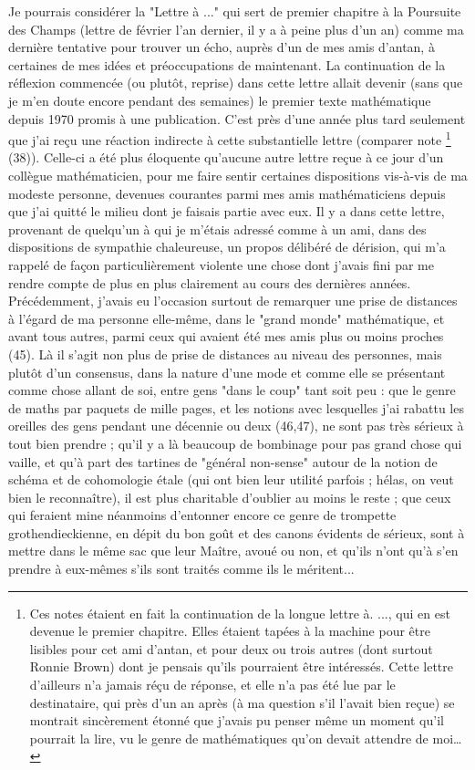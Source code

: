 Je pourrais considérer la "Lettre à ..." qui sert de premier chapitre à la Poursuite des Champs (lettre de février l'an dernier, il y a à peine plus d'un an) comme ma dernière tentative pour trouver un écho, auprès d'un de mes amis d'antan, à certaines de mes idées et préoccupations de maintenant. La continuation de la réflexion commencée (ou plutôt, reprise) dans cette lettre allait devenir (sans que je m’en doute encore pendant des semaines) le premier texte mathématique depuis 1970 promis à une publication. C'est près d'une année plus tard seulement que j’ai reçu une réaction indirecte à cette substantielle lettre (comparer note \footnote{Ces notes étaient en fait la continuation de la longue lettre à. ..., qui en est devenue le premier chapitre. Elles étaient tapées à la machine pour être lisibles pour cet ami d'antan, et pour deux ou trois autres (dont surtout Ronnie Brown) dont je pensais qu'ils pourraient être intéressés. Cette lettre d'ailleurs n'a jamais réçu de réponse, et elle n'a pas été lue par le destinataire, qui près d'un an après (à ma question s'il l'avait bien reçue) se montrait sincèrement étonné que j'avais pu penser même un moment qu'il pourrait la lire, vu le genre de mathématiques qu'on devait attendre de moi…} (38)). Celle-ci a été plus éloquente qu'aucune autre lettre reçue à ce jour d'un collègue mathématicien, pour me faire sentir certaines dispositions vis-à-vis de ma modeste personne, devenues courantes parmi mes amis mathématiciens depuis que j’ai quitté le milieu dont je faisais partie avec eux. Il y a dans cette lettre, provenant de quelqu’un à qui je m'étais adressé comme à un ami, dans des dispositions de sympathie chaleureuse, un propos délibéré de dérision, qui m'a rappelé de façon particulièrement violente une chose dont j'avais fini par me rendre compte de plus en plus clairement au cours des dernières années. Précédemment, j'avais eu l'occasion surtout de remarquer une prise de distances à l'égard de ma personne elle-même, dans le "grand monde" mathématique, et avant tous autres, parmi ceux qui avaient été mes amis plus ou moins proches (45). Là il s'agit non plus de prise de distances au niveau des personnes, mais plutôt d'un consensus, dans la nature d'une mode et comme elle se présentant comme chose allant de soi, entre gens "dans le coup" tant soit peu : que le genre de maths par paquets de mille pages, et les notions avec lesquelles j'ai rabattu les oreilles des gens pendant une décennie ou deux (46,47), ne sont pas très sérieux à tout bien prendre ; qu'il y a là beaucoup de bombinage pour pas grand chose qui vaille, et qu'à part des tartines de "général non-sense" autour de la notion de schéma et de cohomologie étale (qui ont bien leur utilité parfois ; hélas, on veut bien le reconnaître), il est plus charitable d'oublier au moins le reste ; que ceux qui feraient mine néanmoins d'entonner encore ce genre de trompette grothendieckienne, en dépit du bon goût et des canons évidents de sérieux, sont à mettre dans le même sac que leur Maître, avoué ou non, et qu'ils n'ont qu'à s'en prendre à eux-mêmes s'ils sont traités comme ils le méritent...

